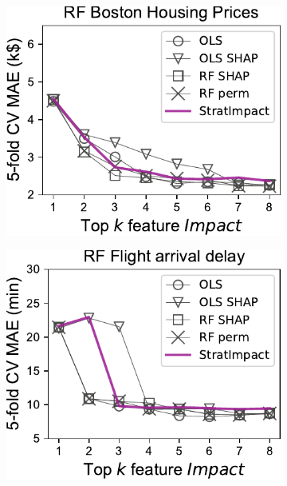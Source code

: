 \documentclass[11pt]{article}
\begin{document}
\begin{figure}
\centering
\begin{subfigure}{.245\textwidth}
    \centering
\includegraphics[scale=0.45]{images/boston-topk-RF-Impact.pdf}
\subcaption{}
\end{subfigure}%
\hfill
\begin{subfigure}{.245\textwidth}
    \centering
\includegraphics[scale=0.45]{images/flights-topk-RF-Impact.pdf}
\subcaption{}
\end{subfigure}
\hfill
\begin{subfigure}{.245\textwidth}
    \centering

\end{subfigure}
\end{figure}
\end{document}
